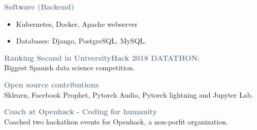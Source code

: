 \textcolor{SlateGrey}{\textbf{Software (Backend)}}
\newline

\begin{itemize}
    \item Kubernetes, Docker, Apache webserver
    \item Databases: Django, PostgreSQL, MySQL. 
\end{itemize}



\textcolor{SlateGrey}{\textbf{Ranking Second in UniversityHack 2018 DATATHON}}: \\ Biggest Spanish data science competition.
\newline


\vspace{1pt}

\textcolor{SlateGrey}{\textbf{Open source contributions}} \\ Sklearn, Facebook Prophet, Pytorch Audio, Pytorch lightning and Jupyter Lab.
\newline


\vspace{1pt}

\textcolor{SlateGrey}{\textbf{Coach at Openhack - Coding for humanity}} \\ Coached two hackathon events for Openhack, a non-porfit organization.



